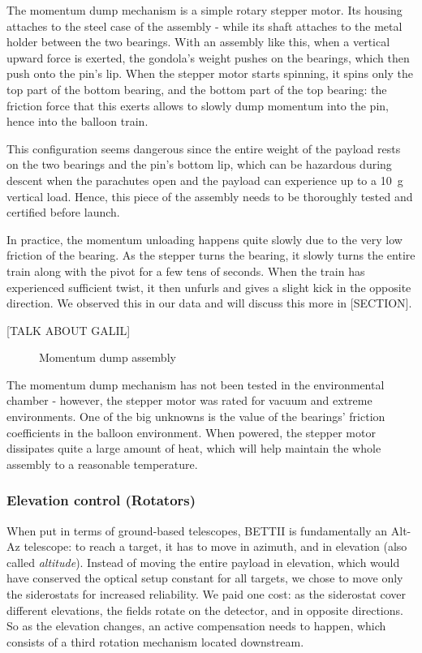 The momentum dump mechanism is a simple rotary stepper motor. Its housing attaches to the steel case of the assembly - while its shaft attaches to the metal holder between the two bearings. With an assembly like this, when a vertical upward force is exerted, the gondola's weight pushes on the bearings, which then push onto the pin's lip. When the stepper motor starts spinning, it spins only the top part of the bottom bearing, and the bottom part of the top bearing: the friction force that this exerts allows to slowly dump momentum into the pin, hence into the balloon train. 

This configuration seems dangerous since the entire weight of the payload rests on the two bearings and the pin's bottom lip, which can be hazardous during descent when the parachutes open and the payload can experience up to a 10~g vertical load. Hence, this piece of the assembly needs to be thoroughly tested and certified before launch. 

In practice, the momentum unloading happens quite slowly due to the very low friction of the bearing. As the stepper turns the bearing, it slowly turns the entire train along with the pivot for a few tens of seconds. When the train has experienced sufficient twist, it then unfurls and gives a slight kick in the opposite direction. We observed this in our data and will discuss this more in [SECTION].

[TALK ABOUT GALIL]
\begin{figure}[!ht]
	\centering
	
	\caption[Momentum dump assembly]{Momentum dump assembly}
	\label{fig:rotator}
    \end{figure}

The momentum dump mechanism has not been tested in the environmental chamber - however, the stepper motor was rated for vacuum and extreme environments. One of the big unknowns is the value of the bearings' friction coefficients in the balloon environment. When powered, the stepper motor dissipates quite a large amount of heat, which will help maintain the whole assembly to a reasonable temperature. 

\subsubsection{Elevation control (Rotators)}

When put in terms of ground-based telescopes, BETTII is fundamentally an Alt-Az telescope: to reach a target, it has to move in azimuth, and in elevation (also called \textit{altitude}). Instead of moving the entire payload in elevation, which would have conserved the optical setup constant for all targets, we chose to move only the siderostats for increased reliability. We paid one cost: as the siderostat cover different elevations, the fields rotate on the detector, and in opposite directions. So as the elevation changes, an active compensation needs to happen, which consists of a third rotation mechanism located downstream.

